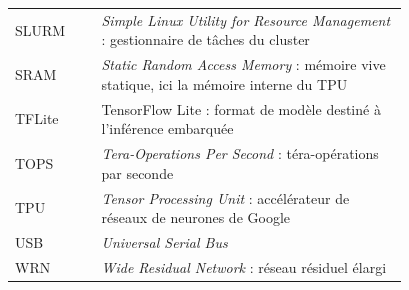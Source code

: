 \documentclass[11pt,a4paper]{report}
\begin{document}
\begin{longtable}{@{}l>{\raggedright\arraybackslash}p{0.78\linewidth}@{}}
SLURM     & \emph{Simple Linux Utility for Resource Management} : gestionnaire de tâches du cluster \\
SRAM      & \emph{Static Random Access Memory} : mémoire vive statique, ici la mémoire interne du TPU \\
TFLite    & TensorFlow Lite : format de modèle destiné à l'inférence embarquée \\
TOPS      & \emph{Tera-Operations Per Second} : téra-opérations par seconde \\
TPU       & \emph{Tensor Processing Unit} : accélérateur de réseaux de neurones de Google \\
USB       & \emph{Universal Serial Bus} \\
WRN       & \emph{Wide Residual Network} : réseau résiduel élargi \\
\bottomrule
\end{longtable}






\printbibliography
\end{document}

